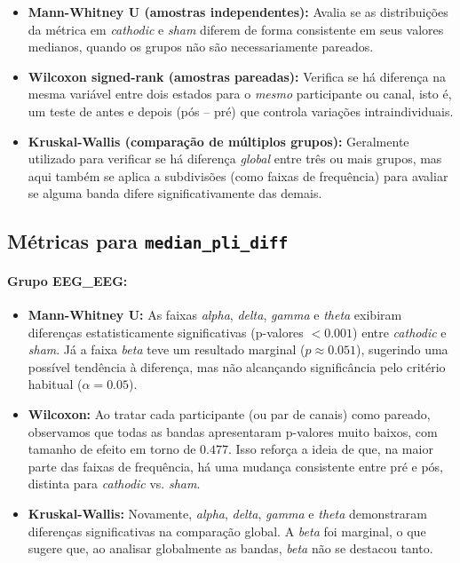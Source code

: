 \begin{itemize}
  \item \textbf{Mann-Whitney U (amostras independentes):} Avalia se as distribuições da métrica em \textit{cathodic} e \textit{sham} diferem de forma consistente em seus valores medianos, quando os grupos não são necessariamente pareados.
  \item \textbf{Wilcoxon signed-rank (amostras pareadas):} Verifica se há diferença na mesma variável entre dois estados para o \emph{mesmo} participante ou canal, isto é, um teste de antes e depois (pós -- pré) que controla variações intraindividuais.
  \item \textbf{Kruskal-Wallis (comparação de múltiplos grupos):} Geralmente utilizado para verificar se há diferença \emph{global} entre três ou mais grupos, mas aqui também se aplica a subdivisões (como faixas de frequência) para avaliar se alguma banda difere significativamente das demais.
\end{itemize}

\subsection{Métricas para \texttt{median\_pli\_diff}}

\paragraph{Grupo EEG\_EEG:}
\begin{itemize}
    \item \textbf{Mann-Whitney U:} As faixas \emph{alpha}, \emph{delta}, \emph{gamma} e \emph{theta} exibiram diferenças estatisticamente significativas (p-valores $< 0.001$) entre \emph{cathodic} e \textit{sham}. Já a faixa \emph{beta} teve um resultado marginal ($p \approx 0.051$), sugerindo uma possível tendência à diferença, mas não alcançando significância pelo critério habitual ($\alpha=0.05$).
    \item \textbf{Wilcoxon:} Ao tratar cada participante (ou par de canais) como pareado, observamos que todas as bandas apresentaram p-valores muito baixos, com tamanho de efeito em torno de $0.477$. Isso reforça a ideia de que, na maior parte das faixas de frequência, há uma mudança consistente entre pré e pós, distinta para \textit{cathodic} vs. \textit{sham}.
    \item \textbf{Kruskal-Wallis:} Novamente, \emph{alpha}, \emph{delta}, \emph{gamma} e \emph{theta} demonstraram diferenças significativas na comparação global. A \emph{beta} foi marginal, o que sugere que, ao analisar globalmente as bandas, \emph{beta} não se destacou tanto.
\end{itemize}

